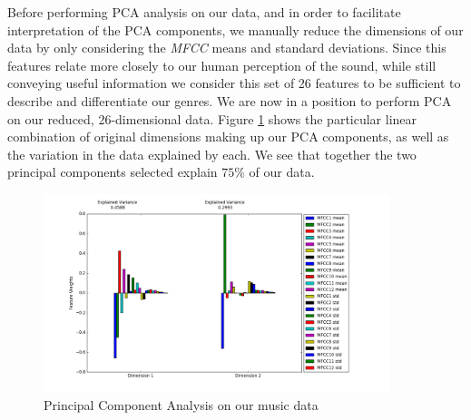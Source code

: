 \documentclass[12pt]{article}
\begin{document}
Before performing PCA analysis on our data, and in order to facilitate interpretation of the PCA components, we manually reduce the dimensions of our data by only considering the \textit{MFCC} means and standard deviations. Since this features relate more closely to our human perception of the sound, while still conveying useful information we consider this set of 26 features to be sufficient to describe and differentiate our genres. We are now in a position to perform PCA on our reduced, 26-dimensional data. Figure \ref{pca_comp} shows the particular linear combination of original dimensions making up our PCA components, as well as the variation in the data explained by each. We see that together the two principal components selected explain $75\%$ of our data.
\begin{figure}
\centering
  \includegraphics[width=0.9\textwidth]{principal_components.png}
  \caption{Principal Component Analysis on our music data}
  \label{pca_comp}
\end{figure}
\medskip
\end{document}
